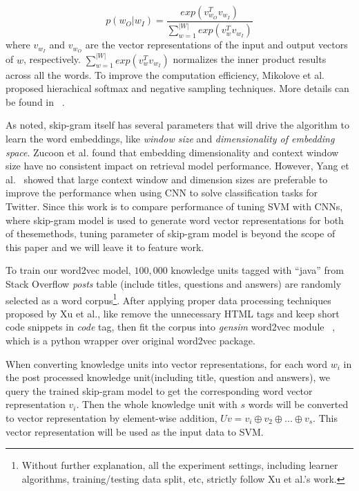 \documentclass[sigconf,review, anonymous]{acmart}
\theoremstyle{break}
\begin{document}
\begin{equation*}
p(w_O|w_I) = \frac{exp(v_{w_O}^Tv_{w_I})}{\sum_{w=1}^{|W|}exp(v_{w}^Tv_{w_I})}
\end{equation*}
where $v_{w_I}$ and $v_{w_O}$ are the vector representations of the input and output vectors of $w$, respectively. 
$\sum_{w=1}^{|W|}exp(v_{w}^Tv_{w_I})$  normalizes the inner product results across all the words.
To improve the computation efficiency, Mikolove et al. \cite{mikolov2013distributed} proposed
hierachical softmax and negative sampling
techniques. More details can be found in ~\cite{mikolov2013distributed}.

As noted, skip-gram itself has several parameters that will drive the algorithm 
to learn the word embeddings,  like {\it window size} and {\it dimensionality of embedding space}. 
Zucoon et al. \cite{zuccon2015integrating} found that embedding dimensionality
and context window size have no consistent impact on retrieval model performance. However,
Yang et al.~\cite{yang2016using} showed that large context window and dimension
 sizes are preferable to improve the performance when using CNN to solve  classification tasks
 for Twitter. Since this work is to compare performance of  tuning SVM  with CNNs, where
 skip-gram model is used to generate word vector representations for both of thesemethods, 
 tuning parameter of skip-gram model is beyond the scope of this paper and we will leave it to feature work.
 
 

To train our word2vec model, $100,000$ knowledge units tagged with ``java'' from
Stack Overflow {\it posts} table  (include titles, questions and answers)
are randomly selected as a word corpus\footnote{Without further explanation, 
all the experiment settings, including learner algorithms,
training/testing data split, etc, strictly follow Xu et al.'s work. }. 
After applying proper data processing techniques proposed by Xu et al., like
 remove the unnecessary HTML tags and keep short code snippets in
{\it code} tag, then fit the corpus into {\it gensim} word2vec module ~\cite{rehurek_lrec},
which is a python wrapper over original word2vec package.

When converting knowledge units into vector representations, 
for each word $w_i$ in the post processed knowledge unit(including title, question and answers),
we query the trained skip-gram model to get the corresponding word vector representation $v_i$.
Then the whole knowledge unit with $s$ words
will be converted to vector representation by element-wise addition, $Uv = v_i \oplus v_2 \oplus...\oplus v_s $. 
This vector representation will be used
as the input data to SVM.
\end{document}
